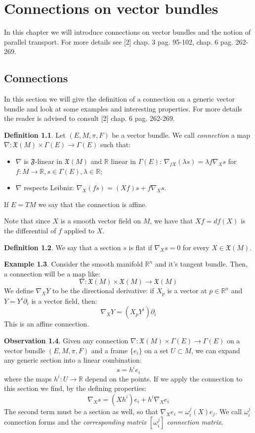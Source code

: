\documentclass[12pt,a4paper]{report}
\theoremstyle{definition}
\newtheorem{Def}{Definition}[chapter]
\theoremstyle{Theorem}
\theoremstyle{definition}
\newtheorem{Ex}[Def]{Example}
\theoremstyle{definition}
\newtheorem{Obs}[Def]{Observation}
\begin{document}
\chapter{Connections on vector bundles}
	In this chapter we will introduce connections on vector bundles and the notion of parallel transport. For more details see [2] chap. 3 pag. 95-102, chap. 6 pag. 262-269.
	\section{Connections}
	In this section we will give the definition of a connection on a generic vector bundle and look at some examples and interesting properties. For more details the reader is advised to consult [2] chap. 6 pag. 262-269.
	\begin{Def}\label{Def_5.7}
		Let $(E,M,\pi,F)$ be a vector bundle. We call \textit{connection} a map $\nabla:\mathfrak{X}(M)\times\Gamma(E)\rightarrow\Gamma(E)$ such that:
		\begin{itemize}
			\item $\nabla$ is $\mathfrak{F}$-linear in $\mathfrak{X}(M)$ and $\mathbb{R}$ linear in $\Gamma(E)$: $\nabla_{fX}(\lambda s)=\lambda f\nabla_X s$ for $f:M\rightarrow \mathbb{R}, s\in\Gamma(E),\lambda\in\mathbb{R}$;
			\item $\nabla$ respects Leibniz: $\nabla_X (fs)=(Xf)s+f\nabla_X s$.
		\end{itemize}
		If $E=TM$ we say that the connection is affine.
	\end{Def}
	Note that since $X$ is a smooth vector field on $M$, we have that $Xf=df(X)$ is the differential of $f$ applied to $X$.
	\begin{Def}\label{Def_5.8}
		We say that a section $s$ is flat if $\nabla_X s=0$ for every $X\in \mathfrak{X}(M)$.
	\end{Def}
	\begin{Ex}
		Consider the smooth manifold $\mathbb{R}^n$ and it's tangent bundle. Then, a connection will be a map like:
		$$\nabla:\mathfrak{X}(M)\times\mathfrak{X}(M)\rightarrow\mathfrak{X}(M)$$
		We define $\nabla_XY$ to be the directional derivative: if $X_p$ is a vector at $p\in\mathbb{R}^n$ and $Y=Y^i\partial_i$ is a vector field, then:
		$$\nabla_XY=(X_pY^i)\partial_i$$
		This is an affine connection.
	\end{Ex}
	\begin{Obs}
		Given any connection $\nabla:\mathfrak{X}(M)\times\Gamma(E)\rightarrow\Gamma(E)$ on a vector bundle $(E,M,\pi,F)$ and a frame $\{e_i\}$ on a set $U\subset M$, we can expand any generic section into a linear combination:
		$$s=h^ie_i$$
		where the maps $h^i:U\rightarrow \mathbb{R}$ depend on the points. If we apply the connection to this section we find, by the defining properties:
		$$\nabla_Xs=(Xh^i)e_i+h^i\nabla_Xe_i$$
		The second term must be a section as well, so that $\nabla_Xe_i=\omega^j_i(X)e_j$. We call $\omega^j_i$ connection forms and the \textit{corresponding matrix} $[\omega^j_i]$ \textit{connection matrix}. 
	\end{Obs}
\end{document}
